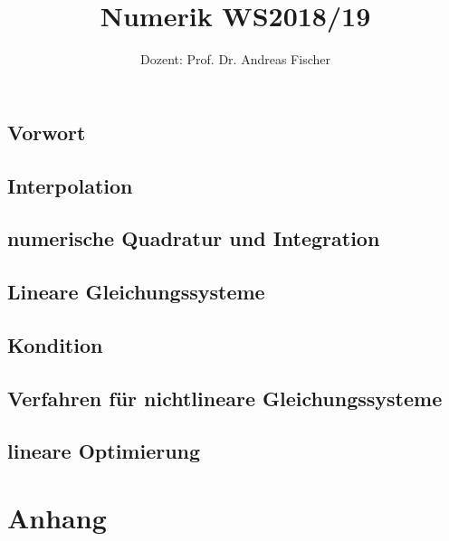 \documentclass[ngerman,a4paper,order=firstname]{../../texmf/tex/latex/mathscript/mathscript}
\title{\textbf{Numerik WS2018/19}}
\author{Dozent: Prof. Dr. Andreas Fischer}
\begin{document}
\pagestyle{plain}

\maketitle

\hypertarget{tocpage}{}
\tableofcontents
{}

\pagebreak
{}
\pagestyle{fancy}

\chapter*{Vorwort}


\chapter{Interpolation}



\chapter{numerische Quadratur und Integration}

\chapter{Lineare Gleichungssysteme}

\chapter{Kondition}

\chapter{Verfahren für nichtlineare Gleichungssysteme}

\chapter{lineare Optimierung}

\part*{Anhang}
\appendix


\printindex
\end{document}
